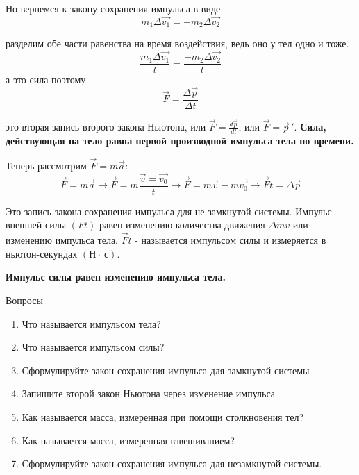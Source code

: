 \documentclass[a6paper, 11pt]{diss_4}
\renewcommand{\'}{\,'}
\begin{document}
 Но вернемся к закону сохранения импульса в виде
\[
m_1\Delta\vec{v_1}=-m_2\Delta\vec{v_2}
\]

разделим обе части равенства на время воздействия, ведь оно у тел одно и тоже.
\[
\frac{m_1\Delta\vec{v_1}}{t}=\frac{-m_2\Delta\vec{v_2}}{t}
\]
а это сила поэтому
\[
\vec{F}=\frac{\Delta\vec{p}}{\Delta t}
\]

 это вторая запись второго закона Ньютона, или $\vec{F}=\frac{d\vec{p}}{dt}$,
или $\vec{F}=\vec{p}\'$. \textbf{Сила, действующая на тело равна первой
производной импульса тела по времени.}

  Теперь рассмотрим $\vec{F}=m\vec{a}$:
\[
\vec{F}=m\vec{a}\to
\vec{F}=m\frac{\vec{v}=\vec{v_0}}{t}\to
\vec{F}=m\vec{v}-m\vec{v_0}\to
\vec{F}t=\Delta\vec{p}
\]

  Это запись закона сохранения импульса для не замкнутой системы. Импульс
внешней силы $(Ft)$ равен изменению количества движения $\Delta mv$ или
изменению импульса тела. $\vec{F}t$ - называется импульсом силы и измеряется
в ньютон-секундах $(Н\cdot\ с)$.

\textbf{Импульс силы равен изменению импульса тела.}

\begin{center}
   Вопросы
\end{center}
\begin{enumerate}
\item Что называется импульсом тела?
\item Что называется импульсом силы?
\item Сформулируйте закон сохранения импульса для замкнутой системы
\item Запишите второй закон Ньютона через изменение импульса
\item Как называется масса, измеренная при помощи столкновения тел?
\item Как называется масса, измеренная взвешиванием?
\item Сформулируйте закон сохранения импульса для незамкнутой системы.
\end{enumerate}
\end{document}

